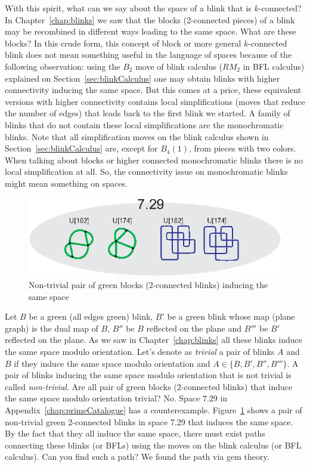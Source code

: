 With this spirit, what can we say about the space of a blink that is
$k$-connected? In Chapter~\ref{chap:blinks} we saw that the blocks
(2-connected pieces) of a blink may be recombined in different
ways leading to the same space. What are these blocks?
In this crude form, this concept of block or more general
$k$-connected blink does not mean something useful in
the language of spaces because of the following
observation: using the $B_2$ move of blink calculus
(\ie $RM_2$ in BFL calculus) explained
on Section~\ref{sec:blinkCalculus} one
may obtain blinks with higher connectivity inducing
the same space. But this comes
at a price, these equivalent versions with higher
connectivity contains local simplifications (moves
that reduce the number of edges) that leads back to
the first blink we started. A family of blinks
that do not contain these local simplifications are the
monochromatic blinks. Note that all simplification moves
on the blink calculus shown in Section~\ref{sec:blinkCalculus}
are, except for $B_4(1)$, from pieces with two colors. When
talking about blocks or higher connected monochromatic
blinks there is no local simplification at all.
So, the connectivity issue on monochromatic blinks
might mean something on spaces.

\begin{figure}[htp]
   \begin{center}
      \leavevmode
      \includegraphics{A.figs/nontrivialgreenblocks.eps}
   \end{center}
   \vspace{-0.7cm}
   \caption{ Non-trivial pair of green blocks (2-connected blinks) inducing the same space}
   \label{fig:nonTrivialGreenBlocks}
\end{figure}

Let $B$ be a green (all edges green) blink, $B'$ be a green blink
whose map (plane graph) is the dual map of $B$, $B''$ be $B$
reflected on the plane and $B'''$ be $B'$ reflected on the plane.
As we saw in Chapter~\ref{chap:blinks} all these blinks induce the
same space modulo orientation. Let's denote as {\it trivial}
a pair of blinks $A$ and $B$ if they induce the same space modulo
orientation and $A \in \{B,B',B'',B'''\}$. A pair of blinks inducing
the same space modulo orientation that is not trivial is called
{\it non-trivial}. Are all pair of green blocks (2-connected blinks)
that induce the same space modulo orientation trivial?
No. Space $7.29$ in Appendix~\ref{chap:primeCatalogue}
has a counterexample. Figure~\ref{fig:nonTrivialGreenBlocks} shows
a pair of non-trivial green 2-connected blinks in space 7.29 that induces
the same space. By the fact that they  all induce the same space, there must exist
paths connecting these blinks (or BFLs) using the moves
on the blink calculus (or BFL
calculus). Can you find such a path? We found the path via gem theory.

